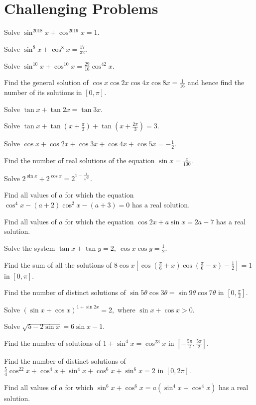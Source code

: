 \section{Challenging Problems}
\startitemize[n, 1*broad]
\item Solve $\sin^{2018}x + \cos^{2019}x = 1.$
\item Solve $\sin^8x + \cos^8x = \frac{17}{32}.$
\item Solve $\sin^{10}x + \cos^{10}x = \frac{29}{16}\cos^42x.$
\item Find the general solution of $\cos x\cos2x\cos4x\cos8x = \frac{1}{16}$ and hence find the number of its solutions
    in $[0, \pi].$
\item Solve $\tan x + \tan2x = \tan3x.$
\item Solve $\tan x + \tan\left(x + \frac{\pi}{3}\right) + \tan\left(x + \frac{2\pi}{3}\right) = 3.$
\item Solve $\cos x + \cos2x + \cos3x + \cos4x + \cos5x = -\frac{1}{2}.$
\item Find the number of real solutions of the equation $\sin x = \frac{x}{100}.$
\item Solve $2^{\sin x} + 2^{\cos x} = 2^{1 - \frac{1}{\sqrt{2}}}.$
\item Find all values of $a$ for which the equation $\cos^4x - (a + 2)\cos^2x - (a + 3) = 0$ has a real solution.
\item Find all values of $a$ for which the equation $\cos2x + a\sin x = 2a - 7$ has a real solution.
\item Solve the system $\tan x + \tan y = 2,~\cos x\cos y = \frac{1}{2}.$
\item Find the sum of all the solutions of $8\cos x\left[\cos\left(\frac{\pi}{6} + x\right)\cos\left(\frac{\pi}{6} -
    x\right) - \frac{1}{2}\right] = 1$ in $[0, \pi].$
\item Find the number of distinct solutions of $\sin5\theta\cos3\theta = \sin9\theta\cos7\theta$ in $\left[0,
    \frac{\pi}{2}\right].$
\item Solve $(\sin x + \cos x)^{1 + \sin2x} = 2,$ where $\sin x + \cos x > 0.$
\item Solve $\sqrt{5 - 2\sin x} = 6\sin x - 1.$
\item Find the number of solutions of $1 + \sin^4x = \cos^23x$ in $\left[-\frac{5\pi}{2}, \frac{5\pi}{2}\right].$
\item Find the number of distinct solutions of $\frac{5}{4}\cos^22x + \cos^4x + \sin^4x + \cos^6x + \sin^6x = 2$ in $[0,
    2\pi].$
\item Find all values of $a$ for which $\sin^6x + \cos^6x = a(\sin^4x + \cos^4x)$ has a real solution.
